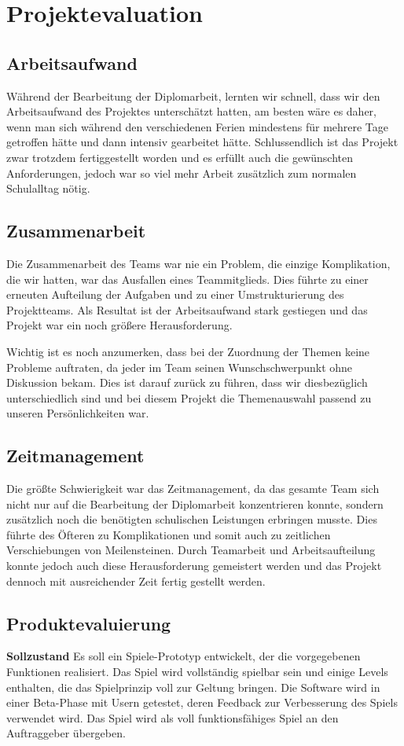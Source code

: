 \chapter{Projektevaluation}
\def \currentAuthor {Lukas Vogel}
\section{Arbeitsaufwand}
Während der Bearbeitung der Diplomarbeit, lernten wir schnell, dass wir den Arbeitsaufwand des Projektes unterschätzt hatten, am besten wäre es daher, wenn man sich während den verschiedenen Ferien mindestens für mehrere Tage getroffen hätte und dann intensiv gearbeitet hätte. Schlussendlich ist das Projekt zwar trotzdem fertiggestellt worden und es erfüllt auch die gewünschten Anforderungen, jedoch war so viel mehr Arbeit zusätzlich zum normalen Schulalltag nötig.
\section{Zusammenarbeit}
Die Zusammenarbeit des Teams war nie ein Problem, die einzige Komplikation, die wir hatten, war das Ausfallen eines Teammitglieds. Dies führte zu einer erneuten Aufteilung der Aufgaben und zu einer Umstrukturierung des Projektteams. Als Resultat ist der Arbeitsaufwand stark gestiegen und das Projekt war ein noch größere Herausforderung. 

Wichtig ist es noch anzumerken, dass bei der Zuordnung der Themen keine Probleme auftraten, da jeder im Team seinen Wunschschwerpunkt ohne Diskussion bekam. Dies ist darauf zurück zu führen, dass wir diesbezüglich unterschiedlich sind und bei diesem Projekt die Themenauswahl passend zu unseren Persönlichkeiten war.

\section{Zeitmanagement}
Die größte Schwierigkeit war das Zeitmanagement, da das gesamte Team sich nicht nur auf die Bearbeitung der Diplomarbeit konzentrieren konnte, sondern zusätzlich noch die benötigten schulischen Leistungen erbringen musste. Dies führte des Öfteren zu Komplikationen und somit auch zu zeitlichen Verschiebungen von Meilensteinen. Durch Teamarbeit und Arbeitsaufteilung konnte jedoch auch diese Herausforderung gemeistert werden und das Projekt dennoch mit ausreichender Zeit fertig gestellt werden.

\section{Produktevaluierung}
\textbf{Sollzustand}\newline
Es soll ein Spiele-Prototyp entwickelt, der die vorgegebenen Funktionen realisiert. Das Spiel wird vollständig spielbar sein und einige Levels enthalten, die das Spielprinzip voll zur Geltung bringen. Die Software wird in einer Beta-Phase mit Usern getestet, deren Feedback zur Verbesserung des Spiels verwendet wird. Das Spiel wird als voll funktionsfähiges Spiel an den Auftraggeber übergeben.

